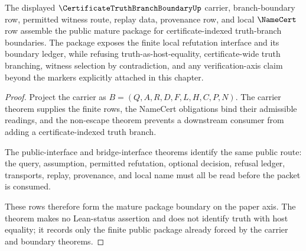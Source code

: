 \begin{theorem}
\label{thm:certificate-truth-branch-boundary-mature-package}
The displayed $\CertificateTruthBranchBoundaryUp$ carrier, branch-boundary row, permitted witness route, replay data, provenance row, and local $\NameCert$ row assemble the public mature package for certificate-indexed truth-branch boundaries. The package exposes the finite local refutation interface and its boundary ledger, while refusing truth-as-host-equality, certificate-wide truth branching, witness selection by contradiction, and any verification-axis claim beyond the markers explicitly attached in this chapter.
\end{theorem}
\begin{proof}
Project the carrier as $B=(Q,A,R,D,F,L,H,C,P,N)$. The carrier theorem supplies the finite rows, the NameCert obligations bind their admissible readings, and the non-escape theorem prevents a downstream consumer from adding a certificate-indexed truth branch.

The public-interface and bridge-interface theorems identify the same public route: the query, assumption, permitted refutation, optional decision, refusal ledger, transports, replay, provenance, and local name must all be read before the packet is consumed.

These rows therefore form the mature package boundary on the paper axis. The theorem makes no Lean-status assertion and does not identify truth with host equality; it records only the finite public package already forced by the carrier and boundary theorems.
\end{proof}


